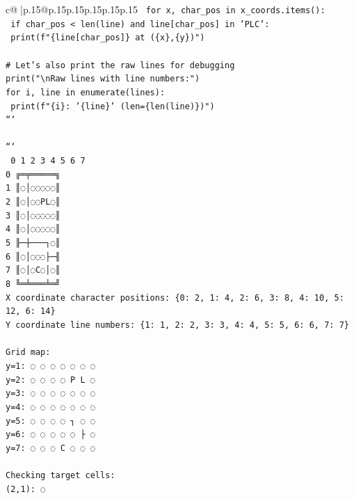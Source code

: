 \documentclass{article}
\begin{document}
{\begin{supertabular}{c@{$\;$}|p{.15\linewidth}@{}p{.15\linewidth}p{.15\linewidth}p{.15\linewidth}p{.15\linewidth}p{.15\linewidth}}
{{{\texttt{    for x, char\_pos in x\_coords.items():} \\
\texttt{        if char\_pos < len(line) and line{[}char\_pos{]} in 'PLC':} \\
\texttt{            print(f"\{line{[}char\_pos{]}\} at (\{x\},\{y\})")} \\
\\ 
\texttt{\# Let's also print the raw lines for debugging} \\
\texttt{print("\textbackslash{}nRaw lines with line numbers:")} \\
\texttt{for i, line in enumerate(lines):} \\
\texttt{    print(f"\{i\}: '\{line\}' (len=\{len(line)\})")} \\
\texttt{```} \\
\\ 
\texttt{```} \\
\texttt{  0 1 2 3 4 5 6 7} \\
\texttt{0 ╔═╤═════╗} \\
\texttt{1 ║◌│◌◌◌◌◌║} \\
\texttt{2 ║◌│◌◌PL◌║} \\
\texttt{3 ║◌│◌◌◌◌◌║} \\
\texttt{4 ║◌│◌◌◌◌◌║} \\
\texttt{5 ╟─┼───┐◌║} \\
\texttt{6 ║◌│◌◌◌├─╢} \\
\texttt{7 ║◌│◌C◌│◌║} \\
\texttt{8 ╚═╧═══╧═╝} \\
\texttt{X coordinate character positions: \{0: 2, 1: 4, 2: 6, 3: 8, 4: 10, 5: 12, 6: 14\}} \\
\texttt{Y coordinate line numbers: \{1: 1, 2: 2, 3: 3, 4: 4, 5: 5, 6: 6, 7: 7\}} \\
\\ 
\texttt{Grid map:} \\
\texttt{y=1: ◌ ◌ ◌ ◌ ◌ ◌ ◌ } \\
\texttt{y=2: ◌ ◌ ◌ ◌ P L ◌ } \\
\texttt{y=3: ◌ ◌ ◌ ◌ ◌ ◌ ◌ } \\
\texttt{y=4: ◌ ◌ ◌ ◌ ◌ ◌ ◌ } \\
\texttt{y=5: ◌ ◌ ◌ ◌ ┐ ◌ ◌ } \\
\texttt{y=6: ◌ ◌ ◌ ◌ ◌ ├ ◌ } \\
\texttt{y=7: ◌ ◌ ◌ C ◌ ◌ ◌ } \\
\\ 
\texttt{Checking target cells:} \\
\texttt{(2,1): ◌} \\
}}}
\end{supertabular}}
\end{document}
